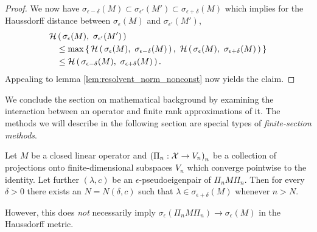 \begin{proof}
    We now have 
    $\sigma_{\epsilon - \delta} (M) 
    \subset \sigma_{\epsilon'} (M') 
    \subset \sigma_{\epsilon + \delta} (M)$
    which implies for the Haussdorff distance between $\sigma_\epsilon (M)$ and 
    $\sigma_{\epsilon'} (M')$,
    \begin{align}
        \scrH & \left(\, \sigma_\epsilon (M),\ \sigma_{\epsilon'} (M') \,\right) \\
        & \leq \max \left\{\,
            \scrH \left(\, \sigma_\epsilon (M),\ \sigma_{\epsilon - \delta} (M) \,\right),\ 
            \scrH \left(\, \sigma_\epsilon (M),\ \sigma_{\epsilon + \delta} (M) \,\right) 
        \,\right\} \\
        & \leq \scrH \left(\, 
            \sigma_{\epsilon - \delta} (M),\ 
            \sigma_{\epsilon + \delta} (M) 
        \,\right) . \label{eq:hauss_epsilon_delta}
    \end{align}
    Appealing to lemma \ref{lem:resolvent_norm_nonconst} now yields the claim. 
    \iffalse
    so we must investigate the difference between $\sigma_{\epsilon - \delta} (M)$ and 
    $\sigma_{\epsilon + \delta} (M)$. But 
    \begin{equation}
        \label{eq:epsilon_delta_diff}
        \sigma_{\epsilon + \delta} (M) \setminus \sigma_{\epsilon - \delta} (M) 
        = \left\{ \lambda \in \bbC \mid 
            \frac{1}{\epsilon + \delta}
            < \left\| (M - \lambda I)^{-1} \right\| 
            < \frac{1}{\epsilon - \delta}
        \right\}
    \end{equation}
    which is just a difference of sublevel sets for the continuous function 
    $\lambda \mapsto \left\| (M - \lambda I)^{-1} \right\|$. Hence 
    \ref{eq:epsilon_delta_diff} collapses continuously to $\emptyset$ as $\delta \to 0$, 
    which implies \ref{eq:hauss_epsilon_delta} converges to $0$ as $\delta \to 0$. 
    \fi
\end{proof}

We conclude the section on mathematical background by examining the interaction between 
an operator and finite rank approximations of it. The methods we will describe in the 
following section are special types of \emph{finite-section methods}. 

\begin{theorem}
    \label{thm:projection_pseudospectrum}
    Let $M$ be a closed linear operator and $\left( \Pi_n : \mathcal{X} \to V_n \right)_n$ be 
    a collection of projections onto finite-dimensional subspaces $V_n$ which converge 
    pointwise to the identity. Let further $(\lambda, c)$ be an 
    $\epsilon$-pseudoeigenpair of $\Pi_n M \Pi_n$. Then for every $\delta > 0$ 
    there exists an $N = N(\delta, c)$ such that 
    $\lambda \in \sigma_{\epsilon + \delta} (M)$ whenever $n > N$. 

    However, this does \emph{not} necessarily imply 
    $\sigma_\epsilon (\Pi_n M \Pi_n) \to \sigma_\epsilon (M)$ in the Haussdorff metric. 
\end{theorem}

